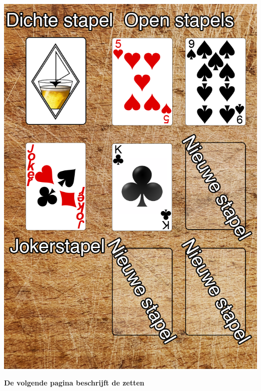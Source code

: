 \begin{minipage}[t]{.48\textwidth}
\includegraphics[width=.96\textwidth]{img/Frits_plank_v4_1.png}
\end{minipage}

\vspace{+0.8cm}

\centerline{\Large{\textbf{De volgende pagina beschrijft de zetten}}}